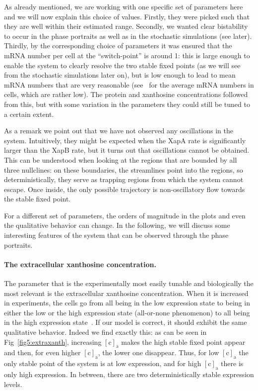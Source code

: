\documentclass[10pt,letterpaper]{article}
\newcommand{\n}[1]{\mathrm{#1}}
\begin{document}
As already mentioned, we are working with one specific set of parameters
here and we will now explain this choice of values. Firstly, they were
picked such that they are well within their estimated range. Secondly, we
wanted clear bistability to occur in the phase portraits as well as in the
stochastic simulations (see later). Thirdly, by the corresponding choice of
parameters it was ensured that the mRNA number per cell at the
``switch-point'' is around 1: this is large enough to enable the system to
clearly resolve the two stable fixed points (as we will see from the
stochastic simulations later on), but is low enough to lead to mean mRNA
numbers that are very reasonable (see~\cite{Milo2016} for the average mRNA
numbers in cells, which are rather low). The protein and xanthosine
concentrations followed from this, but with some variation in the parameters
they could still be tuned to a certain extent.

As a remark we point out that we have not observed any oscillations in the
system. Intuitively, they might be expected when the XapA rate is
significantly larger than the XapB rate, but it turns out that oscillations
cannot be obtained. This can be understood when looking at the regions that
are bounded by all three nullclines: on these boundaries, the streamlines
point into the regions, so deterministically, they serve as
trapping regions from which the system cannot escape. Once inside, the only
possible trajectory is non-oscillatory flow towards the stable fixed point.

For a different set of parameters, the orders of magnitude in the plots and
even the qualitative behavior can change. In the following, we will discuss
some interesting features of the system that can be observed through the
phase portraits. 

\paragraph*{The extracellular xanthosine concentration.}
The parameter that is the experimentally most easily tunable and
biologically the most relevant is the extracellular xanthosine
concentration. When it is increased in experiments, the cells go from all
being in the low expression state to being in either the low or the high
expression state (all-or-none phenomenon) to all being in the high
expression state~\cite{Chure2019}. If our model is correct, it should
exhibit the same qualitative behavior. Indeed we find exactly this: as can
be seen in Fig~\ref{fig5:extraxanth}, increasing $\n{[c]_a}$ makes the high
stable fixed point appear and then, for even higher $\n{[c]_a}$, the lower
one disappear. Thus, for low $\n{[c]_a}$ the only stable point of the system
is at low expression, and for high $\n{[c]_a}$ there is only high
expression. In between, there are two deterministically stable expression
levels.
\end{document}
